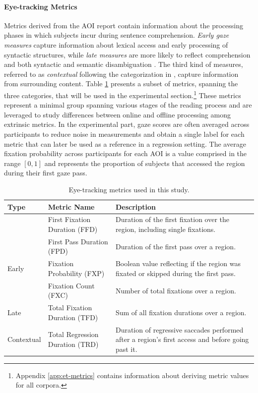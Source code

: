 \documentclass[a4paper, nobind]{templates/ociamthesis}
\begin{document}
\paragraph{Eye-tracking Metrics} Metrics derived from the AOI report contain information about the processing phases in which subjects incur during sentence comprehension. \emph{Early gaze measures} capture information about lexical access and early processing of syntactic structures, while \emph{late measures} are more likely to reflect comprehension and both syntactic and semantic disambiguation \autocite{demberg-keller-2008-data}. The third kind of measures, referred to as \emph{contextual} following the categorization in \textcite{hollenstein-zhang-2019-entity}, capture information from surrounding content. Table \ref{tab:et-metrics} presents a subset of metrics, spanning the three categories, that will be used in the experimental section.\footnote{Appendix \ref{app:et-metrics} contains information about deriving metric values for all corpora.} These metrics represent a minimal group spanning various stages of the reading process and are leveraged to study differences between online and offline processing among extrinsic metrics. In the experimental part, gaze scores are often averaged across participants to reduce noise in measurements and obtain a single label for each metric that can later be used as a reference in a regression setting. The average fixation probability across participants for each AOI is a value comprised in the range \([0,1]\) and represents the proportion of subjects that accessed the region during their first gaze pass.

\begin{table}

\caption{\label{tab:et-metrics}Eye-tracking metrics used in this study.}
\centering
\begin{tabular}[t]{ll>{\raggedright\arraybackslash}p{17em}}
\toprule
\textbf{Type} & \textbf{Metric Name} & \textbf{Description}\\
\midrule
 & First Fixation Duration (FFD) & Duration of the first fixation over the region, including single fixations.\\
\cmidrule{2-3}
 & First Pass Duration (FPD) & Duration of the first pass over a region.\\
\cmidrule{2-3}
\multirow[t]{-3}{*}{\raggedright\arraybackslash Early} & Fixation Probability (FXP) & Boolean value reflecting if the region was fixated or skipped during the first pass.\\
\cmidrule{1-3}
 & Fixation Count (FXC) & Number of total fixations over a region.\\
\cmidrule{2-3}
\multirow[t]{-2}{*}{\raggedright\arraybackslash Late} & Total Fixation Duration (TFD) & Sum of all fixation durations over a region.\\
\cmidrule{1-3}
Contextual & Total Regression Duration (TRD) & Duration of regressive saccades performed after a region's first access and before going past it.\\
\bottomrule
\end{tabular}
\end{table}
\end{document}
